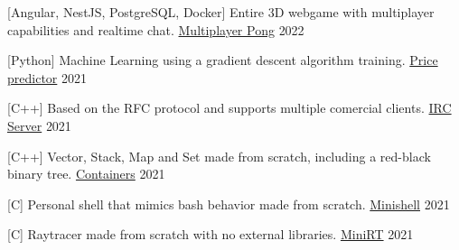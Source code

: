 
\begin{cventries}

  \cventry
    {[Angular, NestJS, PostgreSQL, Docker] Entire 3D webgame with multiplayer capabilities and realtime chat.}
    {\href{https://github.com/pruiz-ca/ft_transcendence}{Multiplayer Pong}}
    {}
    {2022}
    {}



  \cventry
    {[Python] Machine Learning using a gradient descent algorithm training.}
    {\href{https://github.com/pruiz-ca/ft_linear_regression}{Price predictor}}
    {}
    {2021}
    {}

  \cventry
    {[C++] Based on the RFC protocol and supports multiple comercial clients.}
    {\href{https://github.com/pruiz-ca/ft_irc}{IRC Server}}
    {}
    {2021}
    {}

  \cventry
    {[C++] Vector, Stack, Map and Set made from scratch, including a red-black binary tree.}
    {\href{https://github.com/pruiz-ca/ft_containers}{Containers}}
    {}
    {2021}
    {}

  \cventry
    {[C] Personal shell that mimics bash behavior made from scratch.}
    {\href{https://github.com/pruiz-ca/minishell}{Minishell}}
    {}
    {2021}
    {}

  \cventry
    {[C] Raytracer made from scratch with no external libraries.}
    {\href{https://github.com/pruiz-ca/miniRT}{MiniRT}}
    {}
    {2021}
    {}

\end{cventries}
